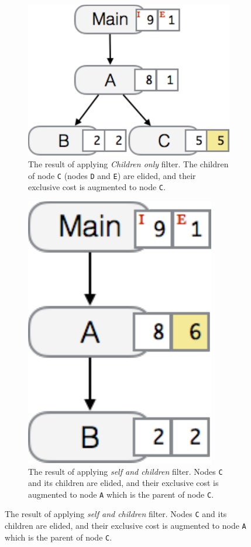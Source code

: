 \begin{figure}
  \begin{subfigure}{.45\textwidth}
    \centering
    \includegraphics[scale=.4]{fig/hpcviewer-filter-children.pdf}
    \caption{The result of applying \emph{Children only} filter. %
The children of node \texttt{C} (nodes \texttt{D} and \texttt{E}) are elided, and their exclusive cost is augmented to node \texttt{C}. }
    \label{fig:filter-children}
  \end{subfigure}%
  \qquad
  \begin{subfigure}{.45\textwidth}
    \centering
    \includegraphics[scale=.4]{fig/hpcviewer-filter-self_children.pdf}
    \caption{The result of applying \emph{self and children} filter. %
Nodes \texttt{C} and its children are elided, and their exclusive cost is augmented to node \texttt{A} which is the parent of node \texttt{C}.}
    \label{fig:filter-selfchildren}
  \end{subfigure}


\end{figure}
